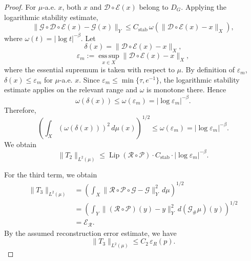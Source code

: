 \documentclass[10pt,a4paper]{amsart}
\newcommand{\Lip}{\operatorname{Lip}}
\begin{document}
\begin{proof}
		For $\mu$-a.e. $x$, both $x$ and $\mathcal D\circ\mathcal E(x)$ belong to $D_G$. Applying the logarithmic stability estimate,
		\begin{equation*}
			\|\mathscr{G}\circ\mathcal{D}\circ\mathcal{E}(x)-\mathscr{G}(x)\|_Y
			\leq
			C_{\mathrm{stab}}\,\omega(\|\mathcal{D}\circ\mathcal{E}(x)-x\|_X),
		\end{equation*}
		where $\omega(t)=|\log t|^{-\beta}$.
		Let
		\begin{equation*}
			\delta(x)=\|\mathcal{D}\circ\mathcal{E}(x)-x\|_X,
		\end{equation*} 
		\begin{equation*}
			\varepsilon_m:=\operatorname*{ess\,sup}_{x\in X}\|\mathcal{D}\circ\mathcal{E}(x)-x\|_X,
		\end{equation*}
		where the essential supremum is taken with respect to $\mu$.
		By definition of $\varepsilon_m$, $\delta(x)\le \varepsilon_m$ for $\mu$-a.e. $x$. Since $\varepsilon_m\le \min\{\tau,e^{-1}\}$, the logarithmic stability estimate applies on the relevant range and $\omega$ is monotone there. Hence
		\begin{equation*}
			\omega(\delta(x))
			\leq
			\omega(\varepsilon_m)
			=
			|\log \varepsilon_m|^{-\beta}.
		\end{equation*}
		Therefore,
		\begin{equation*}
			\left(
			\int_X (\omega(\delta(x)))^2\,d\mu(x)
			\right)^{1/2}
			\leq
			\omega(\varepsilon_m)
			=
			|\log \varepsilon_m|^{-\beta}.
		\end{equation*}
		We obtain
		\begin{equation*}
			\|T_2\|_{L^2(\mu)}
			\leq
			\Lip(\mathcal{R}\circ\mathcal{P})\cdot C_{\mathrm{stab}}\cdot |\log \varepsilon_m|^{-\beta}.
		\end{equation*}
		
		For the third term, we obtain
		\begin{equation*}
			\begin{aligned}
				\|T_3\|_{L^2(\mu)}
				&=
				\left(
				\int_X
				\|
				\mathcal{R}\circ\mathcal{P}\circ \mathscr{G}
				-
				\mathscr{G}
				\|_{Y}^{2}
				\,d\mu
				\right)^{1/2}\\
				&=
				\left(
				\int_Y
				\|(\mathcal R\circ\mathcal P)(y)-y\|_Y^2
				\,d(\mathscr G_\#\mu)(y)
				\right)^{1/2}\\
				&=
				\mathscr E_{\mathcal R}.
			\end{aligned}
		\end{equation*}
		By the assumed reconstruction error estimate, we have
		\begin{equation*}
			\|T_3\|_{L^2(\mu)}
			\leq
			C_2\,\varepsilon_R(p).
		\end{equation*}
		

\end{proof}
\end{document}
